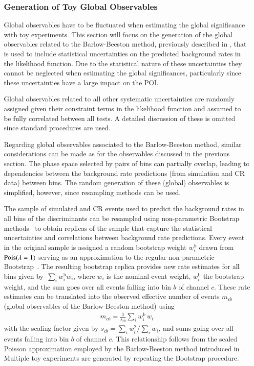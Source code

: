 \subsubsection{Generation of Toy Global Observables}%
\label{sec:toys_global_observables}

Global observables have to be fluctuated when estimating the global significance
with toy experiments. This section will focus on the generation of the global
observables related to the Barlow-Beeston method, previously described in
, that is used to include statistical uncertainties on
the predicted background rates in the likelihood function. Due to the
statistical nature of these uncertainties they cannot be neglected when
estimating the global significances, particularly since these uncertainties have
a large impact on the POI.

Global observables related to all other systematic uncertainties are randomly
assigned given their constraint terms in the likelihood function and assumed to
be fully correlated between all tests. A detailed discussion of these is omitted
since standard procedures are used.

Regarding global observables associated to the Barlow-Beeston method, similar
considerations can be made as for the observables discussed in the previous
section. The phase space selected by pairs of bins can partially overlap,
leading to dependencies between the background rate predictions (from simulation
and CR data) between bins. The random generation of these (global) observables
is simplified, however, since resampling methods can be used.

The sample of simulated and CR events used to predict the background rates in
all bins of the discriminants can be resampled using non-parametric Bootstrap
methods~\cite{10.1214/aos/1176344552,efron1994introduction} to obtain replicas
of the sample that capture the statistical uncertainties and correlations
between background rate predictions. Every event in the original sample is
assigned a random bootstrap weight $w_i^{\text{b}}$ drawn from
$\operatorname{Pois}(\lambda = 1)$ serving as an approximation to the regular non-parametric
Bootstrap~\cite{google:poisson,ATL-PHYS-PUB-2021-011}. The resulting bootstrap
replica provides new rate estimates for all bins given
by~$\sum_{i} w_{i}^{\text{b}} w_i$, where $w_i$ is the nominal event weight,
$w_i^{\text{b}}$ the bootstrap weight, and the sum goes over all events falling
into bin $b$ of channel $c$. These rate estimates can be translated into the
observed effective number of events $m_{cb}$ (global observables of the
Barlow-Beeston method) using
\begin{align*}
  m_{cb} = \frac{1}{s_{cb}} \sum_{i} w_{i}^{\text{b}} \, w_i
\end{align*}
with the scaling factor given by $s_{cb} = \sum_i w_i^2 / \sum_i w_i$, and sums
going over all events falling into bin $b$ of channel $c$. This relationship
follows from the scaled Poisson approximation employed by the Barlow-Beeston
method introduced in~. Multiple toy experiments are
generated by repeating the Bootstrap procedure.


